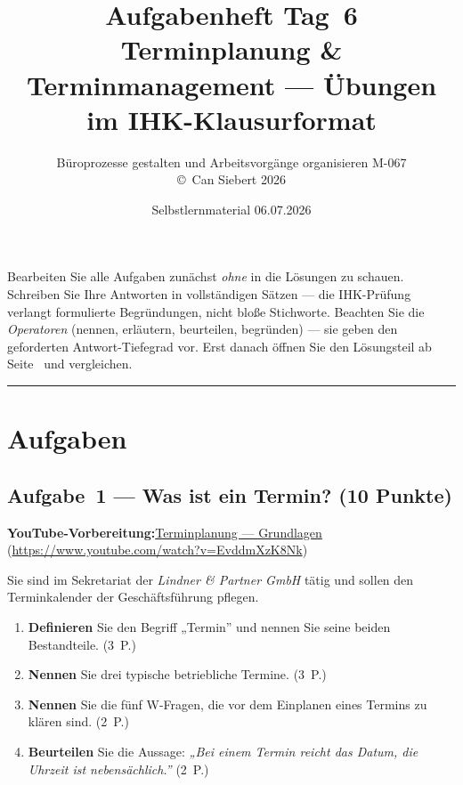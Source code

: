 \documentclass[11pt, a4paper]{article}
\title{\vspace*{-1.5cm}\Huge\bfseries\color{bfwPrimaryDark}Aufgabenheft Tag~6\\[0.4em]
  \large\color{bfwInkSoft}\textnormal{Terminplanung \& Terminmanagement --- Übungen im IHK-Klausurformat}}
\author{\textsf{Büroprozesse gestalten und Arbeitsvorgänge organisieren \textperiodcentered{} M-067}\\
\textsf{\small\copyright\ Can Siebert\,\textperiodcentered\,2026}}
\date{Selbstlernmaterial \textperiodcentered{} 06.07.2026}
\begin{document}
\maketitle
\thispagestyle{empty}

\begin{merksatz}[title={\bfseries So nutzen Sie dieses Aufgabenheft}]
Bearbeiten Sie alle Aufgaben zunächst \emph{ohne} in die Lösungen zu schauen. Schreiben
Sie Ihre Antworten in vollständigen Sätzen --- die IHK-Prüfung verlangt formulierte
Begründungen, nicht bloße Stichworte. Beachten Sie die \emph{Operatoren} (nennen,
erläutern, beurteilen, begründen) --- sie geben den geforderten Antwort-Tiefegrad vor.
Erst danach öffnen Sie den Lösungsteil ab Seite~\pageref{loesungen} und vergleichen.
\end{merksatz}

\tableofcontents
\vspace{1em}
\hrule

\section{Aufgaben}

\subsection*{Aufgabe~1 --- Was ist ein Termin? (10 Punkte)}

\noindent\textbf{\color{bfwAccent}YouTube-Vorbereitung:}\enspace \href{https://www.youtube.com/watch?v=EvddmXzK8Nk}{Terminplanung --- Grundlagen} (\url{https://www.youtube.com/watch?v=EvddmXzK8Nk})

\medskip
Sie sind im Sekretariat der \emph{Lindner \& Partner GmbH} tätig und sollen den
Terminkalender der Geschäftsführung pflegen.

\begin{enumerate}[label=(\alph*)]
  \item \textbf{Definieren} Sie den Begriff „Termin” und nennen Sie seine beiden Bestandteile. \hfill (3~P.)
  \item \textbf{Nennen} Sie drei typische betriebliche Termine. \hfill (3~P.)
  \item \textbf{Nennen} Sie die fünf W-Fragen, die vor dem Einplanen eines Termins zu klären sind. \hfill (2~P.)
  \item \textbf{Beurteilen} Sie die Aussage: \emph{„Bei einem Termin reicht das Datum, die Uhrzeit ist nebensächlich.”} \hfill (2~P.)
\end{enumerate}
\end{document}
